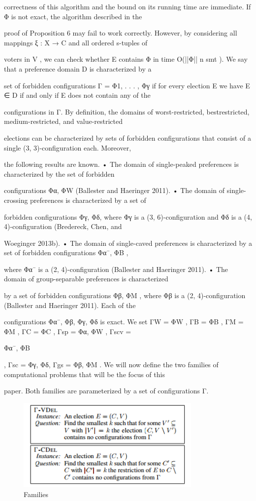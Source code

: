 \documentclass[12pt, a4paper]{report}
\begin{document}
correctness of this algorithm and the bound on its running time are immediate. If Φ is not exact, the algorithm described in the 

proof of Proposition 6 may fail to work correctly. However, by considering all mappings ξ : X → C and all ordered s-tuples of 

voters in V , we can check whether E contains Φ in time O(||Φ|| n smt ). We say that a preference domain D is characterized by a 

set of forbidden configurations Γ = {Φ1, . . . , Φγ} if for every election E we have E ∈ D if and only if E does not contain any of the 

configurations in Γ. By definition, the domains of worst-restricted, bestrestricted, medium-restricted, and value-restricted 

elections can be characterized by sets of forbidden configurations that consist of a single (3, 3)-configuration each. Moreover, 

the following results are known. • The domain of single-peaked preferences is characterized by the set of forbidden 

configurations {Φα, ΦW } (Ballester and Haeringer 2011). • The domain of single-crossing preferences is characterized by a set of 

forbidden configurations {Φγ, Φδ}, where Φγ is a (3, 6)-configuration and Φδ is a (4, 4)-configuration (Bredereck, Chen, and 

Woeginger 2013b). • The domain of single-caved preferences is characterized by a set of forbidden configurations {Φα¯, ΦB }, 

where Φα¯ is a (2, 4)-configuration (Ballester and Haeringer 2011). • The domain of group-separable preferences is characterized 

by a set of forbidden configurations {Φβ, ΦM }, where Φβ is a (2, 4)-configuration (Ballester and Haeringer 2011). Each of the 

configurations Φα¯, Φβ, Φγ, Φδ is exact. We set ΓW = {ΦW }, ΓB = {ΦB }, ΓM = {ΦM }, ΓC = {ΦC }, Γsp = {Φα, ΦW }, Γscv = {Φα¯, ΦB 

}, Γsc = {Φγ, Φδ}, Γgs = {Φβ, ΦM }. We will now define the two families of computational problems that will be the focus of this 

paper. Both families are parameterized by a set of configurations Γ.
\begin{figure}[ht!]
\centering
\includegraphics[width=90mm]{instance.png}
\caption{Families \label{overflow}}

\end{figure}
\end{document}
